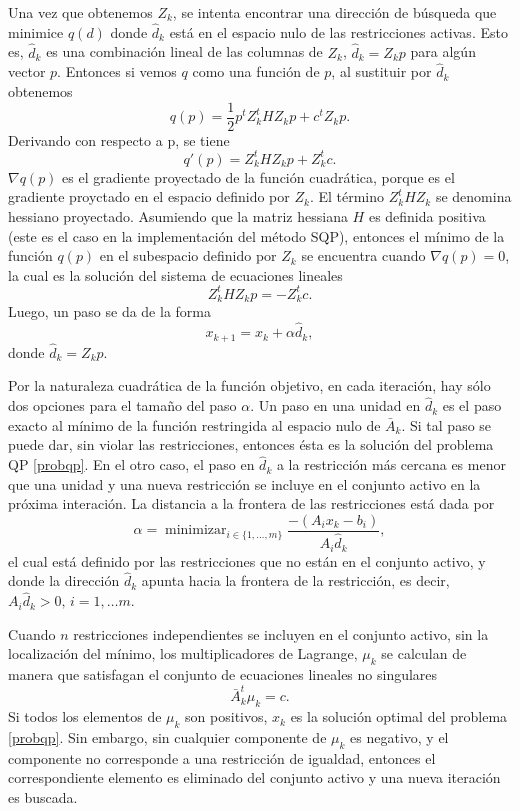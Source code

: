 \documentclass[a4paper,10pt]{book}
\begin{document}
Una vez que obtenemos $Z_k$, se intenta encontrar una dirección de búsqueda que minimice  $q(d)$ donde $\hat{d}_k$ está en el espacio nulo de las restricciones activas. Esto es, $\hat{d}_k$ es una combinación lineal de las columnas de $Z_k$, $\hat{d}_k=Z_kp$ para algún vector $p$.
Entonces si vemos $q$ como una función de $p$, al sustituir por $\hat{d}_k$ obtenemos $$q(p)=\frac{1}{2}p^tZ_k^tHZ_kp+c^tZ_kp.$$
Derivando con respecto a p, se tiene $$q'(p)=Z_k^tHZ_kp+Z_k^tc.$$
$\nabla q(p)$ es el gradiente proyectado de la función cuadrática, porque es el gradiente proyctado en el espacio definido por $Z_k$. El término $Z_k^tHZ_k$ se denomina hessiano proyectado. Asumiendo que la matriz hessiana $H$ es definida positiva (este es el caso en la implementación del método SQP), entonces el mínimo de la función $q(p)$ en el subespacio definido por $Z_k$ se encuentra cuando $\nabla q(p)=0$, la cual es la solución del sistema de ecuaciones lineales $$Z_k^tHZ_kp=-Z_k^tc.$$
Luego, un paso se da de la forma $$x_{k+1}=x_k+\alpha\hat{d}_k,$$
donde $\hat{d}_k=Z_kp$.

Por la naturaleza cuadrática de la función objetivo, en cada iteración, hay sólo dos opciones para el tamaño del paso $\alpha$. Un paso en una unidad en $\hat{d}_k$ es el paso exacto al mínimo de la función restringida al espacio nulo de $\bar A_k$. Si tal paso se puede dar, sin violar las restricciones, entonces ésta es la solución del problema QP \eqref{probqp}. En el otro caso, el paso en $\hat{d}_k$ a la restricción más cercana es menor que una unidad y una nueva restricción se incluye en el conjunto activo en la próxima interación. La distancia a la frontera de las restricciones está dada por $$\alpha=\displaystyle \mathop{\mathrm{minimizar}}_{i\in\{1,\ldots,m\}}\frac{-(A_ix_k-b_i)}{A_i\hat{d}_k},$$
el cual está definido por las restricciones que no están en el conjunto activo, y donde la dirección $\hat{d}_k$ apunta hacia la frontera de la restricción, es decir, $A_i\hat{d}_k>0,\,i=1,\ldots m$.

Cuando $n$ restricciones independientes se incluyen en el conjunto activo, sin la localización del mínimo, los multiplicadores de Lagrange, $\mu_k$ se calculan de manera que satisfagan el conjunto de ecuaciones lineales no singulares $$\bar A_k^t\mu_k=c.$$
Si todos los elementos de $\mu_k$ son positivos, $x_k$ es la solución optimal del problema \eqref{probqp}. Sin embargo, sin cualquier componente de $\mu_k$ es negativo, y el componente no corresponde a una restricción de igualdad, entonces el correspondiente elemento es eliminado del conjunto activo y una nueva iteración es buscada.
\end{document}
